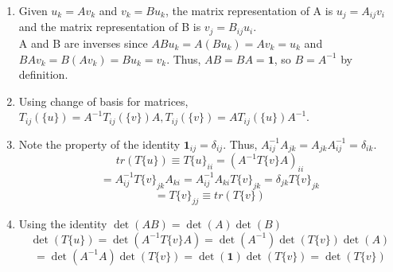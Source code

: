\begin{sol}
\begin{enumerate}[label=\textbf{(\alph*)}]
\item
Given $u_k=Av_k$ and $v_k=Bu_k$, the matrix representation of A is $u_j=A_{ij} v_i$ and the matrix representation of B is $v_j=B_{ij}u_i$. 
\\A and B are inverses since $ABu_k=A(Bu_k)=Av_k=u_k$ and $BAv_k=B(Av_k)=Bu_k=v_k$. Thus, $AB=BA=\mathbf{1}$, so $B=A^{-1}$ by definition.
\item
Using change of basis for matrices, $T_{ij}(\{u\})=A^{-1}T_{ij}(\{v\})A, T_{ij}(\{v\})=AT_{ij}(\{u\})A^{-1}$.
\item
Note the property of the identity $\mathbf{1}_{ij}=\delta_{ij}$. Thus, $A^{-1}_{ij}A_{jk}=A_{jk}A^{-1}_{ij}=\delta_{ik}$.
\begin{equation}
	tr(T\{u\})\equiv T\{u\}_{ii}=(A^{-1}T\{v\}A)_{ii}
\end{equation} 
\begin{equation}
	=A^{-1}_{ij}T\{v\}_{jk}A_{ki}=A^{-1}_{ij}A_{ki}T\{v\}_{jk}=\delta_{jk}T\{v\}_{jk}
\end{equation}   
\begin{equation}
	=T\{v\}_{jj}\equiv tr(T\{v\})
\end{equation}  
\item
Using the identity $\det(AB)=\det(A)\det(B)$
\begin{equation}
	\det(T\{u\})=\det(A^{-1}T\{v\}A)=\det(A^{-1})\det(T\{v\})\det(A)
\end{equation}
\begin{equation}
	=\det(A^{-1}A)\det(T\{v\})=\det(\mathbf{1})\det(T\{v\})=\det(T\{v\})
\end{equation} 

\end{enumerate}
\end{sol}